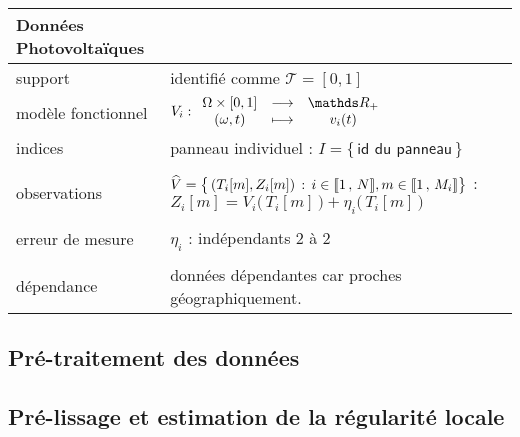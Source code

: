 \noalign\begin{tabularx}{\textwidth}{XX}
	\toprule
	\textbf{Données Photovoltaïques}                                                                                                                                                                                   \\
	\midrule
	support            & identifié comme $\mathcal T = [0,1]$                                                                                                                                                          \\
	modèle fonctionnel & ${V}_i : \func {\Omega \times [0,1]} {\mathds R_+} {(\omega, t)} {v_i(t)}$                                                                                                                    \\
	indices            & panneau individuel : $I = \bigl\{ \, \textsf{id du panneau} \,\bigr\}$                                                                                                                        \\
	\\
	observations       & $\widehat V = \bigl\{ \, (T_i[m], Z_i[m]) \, : \, i \in \llbracket 1 \, , \, N \rrbracket, m \in \llbracket 1 \, , \, M_i \rrbracket \bigr\}$ : $Z_i[m] = V_i\bigl( \, T_i[m] \, \bigr) + \eta_i\bigl( \, T_i[m] \, \bigr)$ \\
	\\
	erreur de mesure   & $\eta_i$ : indépendants 2 à 2                                                                                                                                                                 \\
	\\
	dépendance         & données dépendantes car proches géographiquement.                                                                                                                                             \\
	\bottomrule
\end{tabularx}


\subsection{Pré-traitement des données}

\subsection{Pré-lissage et estimation de la régularité locale}

